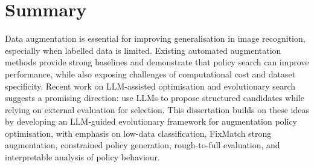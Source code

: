 \documentclass[12pt,a4paper]{report}
\begin{document}
\section{Summary}

Data augmentation is essential for improving generalisation in image recognition, especially when labelled data is limited. Existing automated augmentation methods provide strong baselines and demonstrate that policy search can improve performance, while also exposing challenges of computational cost and dataset specificity. Recent work on LLM-assisted optimisation and evolutionary search suggests a promising direction: use LLMs to propose structured candidates while relying on external evaluation for selection. This dissertation builds on these ideas by developing an LLM-guided evolutionary framework for augmentation policy optimisation, with emphasis on low-data classification, FixMatch strong augmentation, constrained policy generation, rough-to-full evaluation, and interpretable analysis of policy behaviour.



\end{document}

